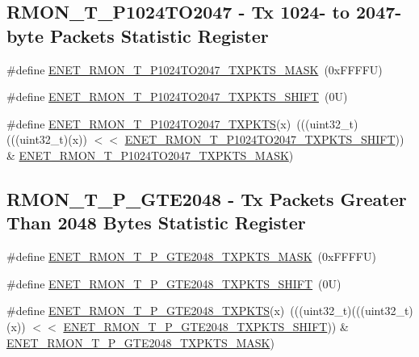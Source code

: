 \subsection*{R\+M\+O\+N\+\_\+\+T\+\_\+\+P1024\+T\+O2047 -\/ Tx 1024-\/ to 2047-\/byte Packets Statistic Register}
\begin{DoxyCompactItemize}
\item 
\#define \mbox{\hyperlink{group___e_n_e_t___register___masks_ga874fdbd030f1c4a977a7f989cb316a6c}{E\+N\+E\+T\+\_\+\+R\+M\+O\+N\+\_\+\+T\+\_\+\+P1024\+T\+O2047\+\_\+\+T\+X\+P\+K\+T\+S\+\_\+\+M\+A\+SK}}~(0x\+F\+F\+F\+F\+U)
\item 
\#define \mbox{\hyperlink{group___e_n_e_t___register___masks_gaec4f9a8714bcb59e866d0e64b70f0fde}{E\+N\+E\+T\+\_\+\+R\+M\+O\+N\+\_\+\+T\+\_\+\+P1024\+T\+O2047\+\_\+\+T\+X\+P\+K\+T\+S\+\_\+\+S\+H\+I\+FT}}~(0\+U)
\item 
\#define \mbox{\hyperlink{group___e_n_e_t___register___masks_ga7d34dedcf25d5b7973dc87c620f61e75}{E\+N\+E\+T\+\_\+\+R\+M\+O\+N\+\_\+\+T\+\_\+\+P1024\+T\+O2047\+\_\+\+T\+X\+P\+K\+TS}}(x)~(((uint32\+\_\+t)(((uint32\+\_\+t)(x)) $<$$<$ \mbox{\hyperlink{group___e_n_e_t___register___masks_gaec4f9a8714bcb59e866d0e64b70f0fde}{E\+N\+E\+T\+\_\+\+R\+M\+O\+N\+\_\+\+T\+\_\+\+P1024\+T\+O2047\+\_\+\+T\+X\+P\+K\+T\+S\+\_\+\+S\+H\+I\+FT}})) \& \mbox{\hyperlink{group___e_n_e_t___register___masks_ga874fdbd030f1c4a977a7f989cb316a6c}{E\+N\+E\+T\+\_\+\+R\+M\+O\+N\+\_\+\+T\+\_\+\+P1024\+T\+O2047\+\_\+\+T\+X\+P\+K\+T\+S\+\_\+\+M\+A\+SK}})
\end{DoxyCompactItemize}
\subsection*{R\+M\+O\+N\+\_\+\+T\+\_\+\+P\+\_\+\+G\+T\+E2048 -\/ Tx Packets Greater Than 2048 Bytes Statistic Register}
\begin{DoxyCompactItemize}
\item 
\#define \mbox{\hyperlink{group___e_n_e_t___register___masks_ga6727e73f1f19091ffc8c3677c27cf51c}{E\+N\+E\+T\+\_\+\+R\+M\+O\+N\+\_\+\+T\+\_\+\+P\+\_\+\+G\+T\+E2048\+\_\+\+T\+X\+P\+K\+T\+S\+\_\+\+M\+A\+SK}}~(0x\+F\+F\+F\+F\+U)
\item 
\#define \mbox{\hyperlink{group___e_n_e_t___register___masks_ga8ebafd824d8947f833675eeed78a3fb1}{E\+N\+E\+T\+\_\+\+R\+M\+O\+N\+\_\+\+T\+\_\+\+P\+\_\+\+G\+T\+E2048\+\_\+\+T\+X\+P\+K\+T\+S\+\_\+\+S\+H\+I\+FT}}~(0\+U)
\item 
\#define \mbox{\hyperlink{group___e_n_e_t___register___masks_gaa17d4f1013a6f284d558190f7aab76ac}{E\+N\+E\+T\+\_\+\+R\+M\+O\+N\+\_\+\+T\+\_\+\+P\+\_\+\+G\+T\+E2048\+\_\+\+T\+X\+P\+K\+TS}}(x)~(((uint32\+\_\+t)(((uint32\+\_\+t)(x)) $<$$<$ \mbox{\hyperlink{group___e_n_e_t___register___masks_ga8ebafd824d8947f833675eeed78a3fb1}{E\+N\+E\+T\+\_\+\+R\+M\+O\+N\+\_\+\+T\+\_\+\+P\+\_\+\+G\+T\+E2048\+\_\+\+T\+X\+P\+K\+T\+S\+\_\+\+S\+H\+I\+FT}})) \& \mbox{\hyperlink{group___e_n_e_t___register___masks_ga6727e73f1f19091ffc8c3677c27cf51c}{E\+N\+E\+T\+\_\+\+R\+M\+O\+N\+\_\+\+T\+\_\+\+P\+\_\+\+G\+T\+E2048\+\_\+\+T\+X\+P\+K\+T\+S\+\_\+\+M\+A\+SK}})
\end{DoxyCompactItemize}
